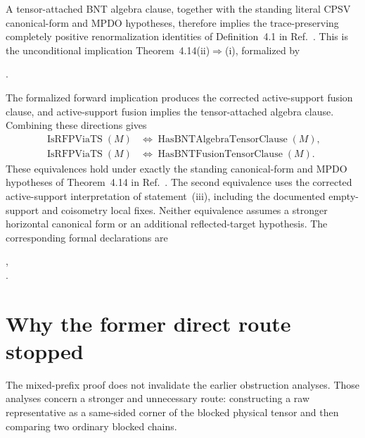 \documentclass{article}
\begin{document}
A tensor-attached BNT algebra clause, together with the standing literal CPSV
canonical-form and MPDO hypotheses, therefore implies the trace-preserving
completely positive renormalization identities of Definition~4.1 in
Ref.~\cite{Cirac2016MPDO_arXiv}. This is the unconditional implication
Theorem~4.14(ii)$\Rightarrow$(i), formalized by
\begin{center}
\scriptsize
{}.
\end{center}

The formalized forward implication produces the corrected active-support
fusion clause, and active-support fusion implies the tensor-attached algebra
clause. Combining these directions gives
\begin{align}
    \operatorname{IsRFPViaTS}(M)
    &\Longleftrightarrow
      \operatorname{HasBNTAlgebraTensorClause}(M),
    \label{eq:cpsv16_two_site_sector_unitary_gauge_gap_rfp_algebra_equivalence}\\
    \operatorname{IsRFPViaTS}(M)
    &\Longleftrightarrow
      \operatorname{HasBNTFusionTensorClause}(M).
    \label{eq:cpsv16_two_site_sector_unitary_gauge_gap_rfp_fusion_equivalence}
\end{align}
These equivalences hold under exactly the standing canonical-form and MPDO
hypotheses of Theorem~4.14 in Ref.~\cite{Cirac2016MPDO_arXiv}. The second
equivalence uses the corrected active-support interpretation of
statement~(iii), including the documented empty-support and coisometry local
fixes. Neither equivalence assumes a stronger horizontal canonical form or an
additional reflected-target hypothesis. The corresponding formal
declarations are
\begin{center}
\scriptsize
\mbox{,}\\
\mbox{.}
\end{center}

\section{Why the former direct route stopped}

The mixed-prefix proof does not invalidate the earlier obstruction analyses.
Those analyses concern a stronger and unnecessary route: constructing a raw
representative as a same-sided corner of the blocked physical tensor and then
comparing two ordinary blocked chains.
\end{document}
